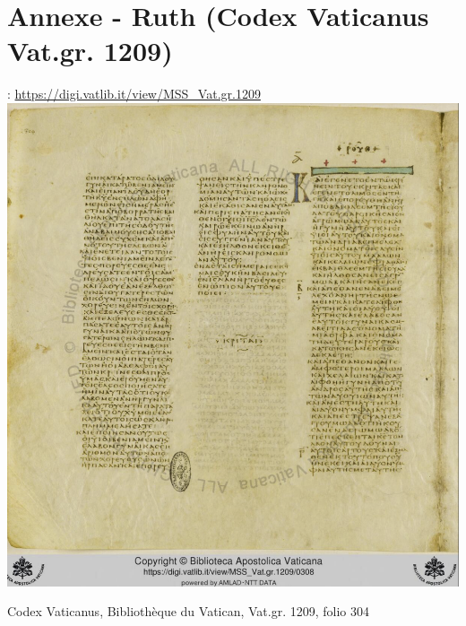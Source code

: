 \documentclass[11pt,a4paper]{article}
\begin{document}
\section*{Annexe - Ruth (Codex Vaticanus Vat.gr. 1209)}
    \Source: \href{https://digi.vatlib.it/view/MSS_Vat.gr.1209}{https://digi.vatlib.it/view/MSS\_Vat.gr.1209}\\
    \includegraphics[width=\textwidth]{img/Codex Vaticanus_GA03_Vat.gr1209_fol_304.png}
    \caption{Codex Vaticanus, Bibliothèque du Vatican, Vat.gr. 1209, folio 304}
\end{document}
